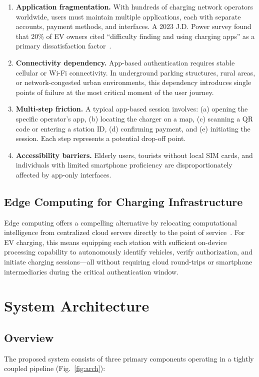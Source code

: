 \documentclass[conference]{IEEEtran}
\begin{document}
\begin{enumerate}
\item \textbf{Application fragmentation.} With hundreds of charging network operators worldwide, users must maintain multiple applications, each with separate accounts, payment methods, and interfaces. A 2023 J.D. Power survey found that 20\% of EV owners cited ``difficulty finding and using charging apps'' as a primary dissatisfaction factor~\cite{b3}.

\item \textbf{Connectivity dependency.} App-based authentication requires stable cellular or Wi-Fi connectivity. In underground parking structures, rural areas, or network-congested urban environments, this dependency introduces single points of failure at the most critical moment of the user journey.

\item \textbf{Multi-step friction.} A typical app-based session involves: (a) opening the specific operator's app, (b) locating the charger on a map, (c) scanning a QR code or entering a station ID, (d) confirming payment, and (e) initiating the session. Each step represents a potential drop-off point.

\item \textbf{Accessibility barriers.} Elderly users, tourists without local SIM cards, and individuals with limited smartphone proficiency are disproportionately affected by app-only interfaces.
\end{enumerate}

\subsection{Edge Computing for Charging Infrastructure}
Edge computing offers a compelling alternative by relocating computational intelligence from centralized cloud servers directly to the point of service~\cite{b4}. For EV charging, this means equipping each station with sufficient on-device processing capability to autonomously identify vehicles, verify authorization, and initiate charging sessions---all without requiring cloud round-trips or smartphone intermediaries during the critical authentication window.

\section{System Architecture}

\subsection{Overview}
The proposed system consists of three primary components operating in a tightly coupled pipeline (Fig.~\ref{fig:arch}):
\end{document}
